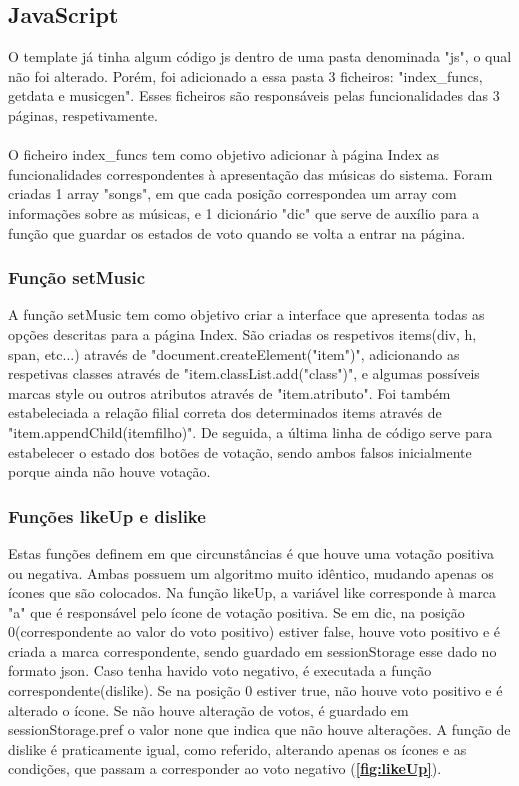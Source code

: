 \documentclass{report}
\begin{document}
\subsection{JavaScript}
\label{ssec:JavaScript}
\hspace{5pt}O template já tinha algum código \ac{js} dentro de uma pasta denominada "js", o 
qual não foi alterado. Porém, foi adicionado a essa pasta 3 ficheiros: "index\_funcs, getdata 
e musicgen". Esses ficheiros são responsáveis pelas funcionalidades das 3 páginas, respetivamente. 
\paragraph{}
\hspace{5pt}O ficheiro index\_funcs tem como objetivo adicionar à página Index as funcionalidades 
correspondentes à apresentação das músicas do sistema.
Foram criadas 1 array "songs", em que cada posição correspondea  um array com informações sobre 
as músicas,  e 1 dicionário "dic" que serve de auxílio para a função que guardar os estados de 
voto quando se volta a entrar na página.

\subsubsection{Função setMusic}
\label{ssec:setMusic}
\hspace{5pt}A função setMusic tem como objetivo criar a interface que apresenta todas as opções 
descritas para a página Index. São criadas os respetivos items(div, h, span, etc...) através de 
"document.createElement("item")", adicionando as respetivas classes através de "item.classList.add("class")", 
e algumas possíveis marcas style ou outros atributos através de "item.atributo". Foi também 
estabeleciada a relação filial correta dos determinados items através de "item.appendChild(itemfilho)". 
De seguida, a última linha de código serve para estabelecer o estado dos botões de votação, sendo 
ambos falsos inicialmente porque ainda não houve votação.

\subsubsection{Funções likeUp e dislike}
\label{ssec:likeUpdislike}
\hspace{5pt}Estas funções definem em que circunstâncias é que houve uma votação positiva ou negativa. 
Ambas possuem um algoritmo muito idêntico, mudando apenas os ícones que são colocados. Na função likeUp, 
a variável like corresponde à marca "a" que é responsável pelo ícone de votação positiva. Se em dic, 
na posição 0(correspondente ao valor do voto positivo) estiver false, houve voto positivo e é criada 
a marca correspondente, sendo guardado em sessionStorage esse dado no formato \ac{json}. Caso tenha 
havido voto negativo, é executada a função correspondente(dislike). Se na posição 0 estiver true, não 
houve voto positivo e é alterado o ícone. Se não houve alteração de votos, é guardado em sessionStorage.pref 
o valor none que indica que não houve alterações. A função de dislike é praticamente igual, como referido, 
alterando apenas os ícones e as condições, que passam a corresponder ao voto negativo (\textbf{\autoref{fig:likeUp}}).
\end{document}

